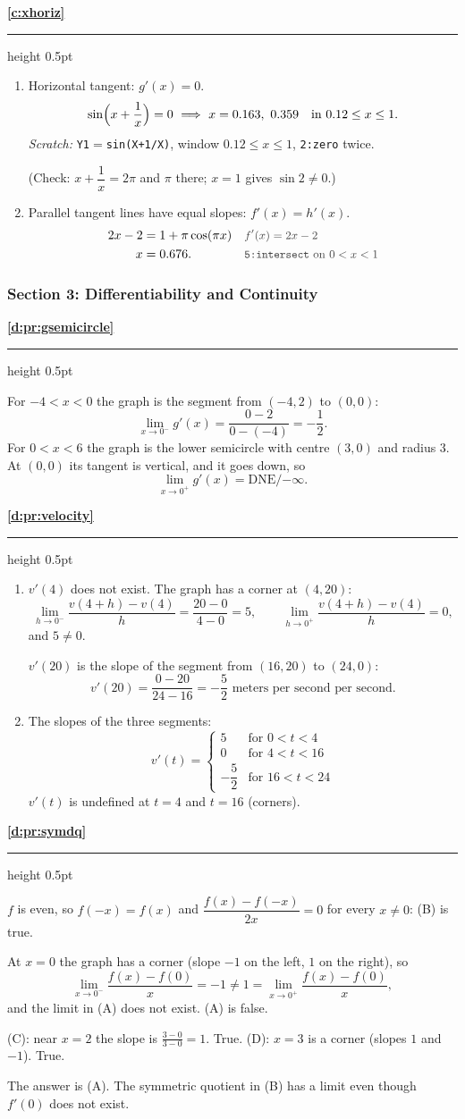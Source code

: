 \documentclass[11pt,a4paper]{article}
\newcommand{\solitem}[2]{%
 \par\addvspace{16pt}\Needspace{10\baselineskip}%
 {\large\bfseries \ref{#1}}\par\nobreak\vspace{2pt}%
 {\color{rulegray}\hrule height 0.5pt}\nobreak\vspace{7pt}%
 #2\par}
\newcommand{\DNEninf}{\ensuremath{\text{DNE}/{-\infty}}}
\newcommand{\why}[1]{\text{\small\color{darkgray}#1}}
\newcommand{\scratch}[1]{{\small\color{darkgray}\textit{Scratch:} #1}\par}
\newcommand{\imp}{\ \Longrightarrow\ }
\begin{document}
\solitem{c:xhoriz}{%
\begin{enumerate}[label=(\alph*)]
 \item Horizontal tangent: $g'(x)=0$.
 \[
 \sin\Bigl(x+\frac1x\Bigr)=0\imp x=0.163,\ 0.359 \quad\text{in } 0.12\le x\le1.
 \]
 \scratch{\texttt{Y1}$=$\texttt{sin(X+1/X)}, window $0.12\le x\le1$, \texttt{2:zero} twice.}
 (Check: $x+\dfrac1x=2\pi$ and $\pi$ there; $x=1$ gives $\sin2\ne0$.)
 \item Parallel tangent lines have equal slopes: $f'(x)=h'(x)$.
 \begin{align*}
 2x-2&=1+\pi\cos(\pi x) &&\why{$f'(x)=2x-2$}\\
 x&=0.676. &&\why{\texttt{5:intersect} on $0<x<1$}
 \end{align*}
\end{enumerate}
}

\subsubsection*{Section 3: Differentiability and Continuity}
\solitem{d:pr:gsemicircle}{%
For $-4<x<0$ the graph is the segment from $(-4,2)$ to $(0,0)$:
\[
\lim_{x\to0^-}g'(x)=\frac{0-2}{0-(-4)}=-\frac12.
\]
For $0<x<6$ the graph is the lower semicircle with centre $(3,0)$ and radius $3$. At $(0,0)$ its tangent is vertical, and it goes down, so
\[
\lim_{x\to0^+}g'(x)=\DNEninf.
\]
}

\solitem{d:pr:velocity}{%
\begin{enumerate}[label=(\alph*)]
 \item $v'(4)$ does not exist. The graph has a corner at $(4,20)$:
 \[
 \lim_{h\to0^-}\frac{v(4+h)-v(4)}{h}=\frac{20-0}{4-0}=5,\qquad \lim_{h\to0^+}\frac{v(4+h)-v(4)}{h}=0,
 \]
 and $5\ne0$.

 $v'(20)$ is the slope of the segment from $(16,20)$ to $(24,0)$:
 \[
 v'(20)=\frac{0-20}{24-16}=-\frac52 \text{ meters per second per second}.
 \]
 \item The slopes of the three segments:
 \[
 v'(t)=\begin{cases}5 & \text{for } 0<t<4\\ 0 & \text{for } 4<t<16\\ -\dfrac52 & \text{for } 16<t<24\end{cases}
 \]
 $v'(t)$ is undefined at $t=4$ and $t=16$ (corners).
\end{enumerate}
}

\solitem{d:pr:symdq}{%
$f$ is even, so $f(-x)=f(x)$ and $\dfrac{f(x)-f(-x)}{2x}=0$ for every $x\ne0$: (B) is true.

At $x=0$ the graph has a corner (slope $-1$ on the left, $1$ on the right), so
\[
\lim_{x\to0^-}\frac{f(x)-f(0)}{x}=-1\ne1=\lim_{x\to0^+}\frac{f(x)-f(0)}{x},
\]
and the limit in (A) does not exist. (A) is false.

(C): near $x=2$ the slope is $\frac{3-0}{3-0}=1$. True. (D): $x=3$ is a corner (slopes $1$ and $-1$). True.

The answer is (A). The symmetric quotient in (B) has a limit even though $f'(0)$ does not exist.
}
\end{document}
